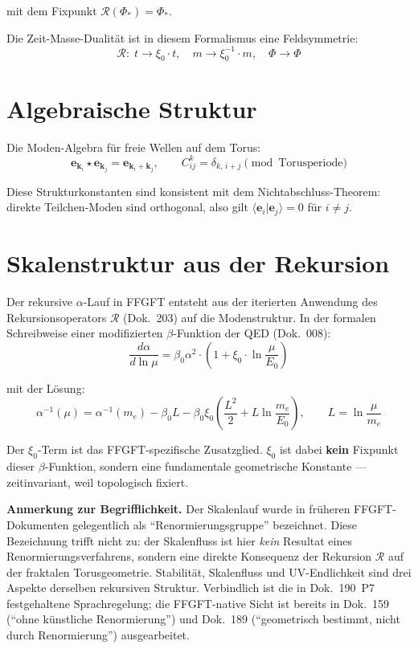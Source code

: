 mit dem Fixpunkt $\mathcal{R}(\Phi_*) = \Phi_*$.

Die Zeit-Masse-Dualität ist in diesem Formalismus eine Feldsymmetrie:
\begin{equation}
  \mathcal{R}:\; t \to \xi_0 \cdot t,\quad m \to \xi_0^{-1} \cdot m,
  \quad \Phi \to \Phi
\end{equation}

\section{Algebraische Struktur}

Die Moden-Algebra für freie Wellen auf dem Torus:
\begin{equation}
  \mathbf{e}_{\mathbf{k}_i} \star \mathbf{e}_{\mathbf{k}_j}
  = \mathbf{e}_{\mathbf{k}_i + \mathbf{k}_j},
  \qquad
  C_{ij}^k = \delta_{k,\,i+j} \pmod{\text{Torusperiode}}
\end{equation}

Diese Strukturkonstanten sind konsistent mit dem Nichtabschluss-Theorem:
direkte Teilchen-Moden sind orthogonal, also gilt
$\langle\mathbf{e}_i|\mathbf{e}_j\rangle = 0$ für $i \neq j$.

\section{Skalenstruktur aus der Rekursion}

Der rekursive $\alpha$-Lauf in FFGFT entsteht aus der iterierten
Anwendung des Rekursionsoperators $\mathcal{R}$ (Dok.~203) auf die
Modenstruktur. In der formalen Schreibweise einer modifizierten
$\beta$-Funktion der QED (Dok.~008):
\begin{equation}
  \frac{d\alpha}{d\ln\mu}
  = \beta_0\alpha^2\cdot\left(1 + \xi_0\cdot\ln\frac{\mu}{E_0}\right)
\end{equation}

mit der Lösung:
\begin{equation}
  \alpha^{-1}(\mu)
  = \alpha^{-1}(m_e)
    - \beta_0 L
    - \beta_0\xi_0\left(\frac{L^2}{2} + L\ln\frac{m_e}{E_0}\right),
  \qquad L = \ln\frac{\mu}{m_e}
\end{equation}

Der $\xi_0$-Term ist das FFGFT-spezifische Zusatzglied.
$\xi_0$ ist dabei \textbf{kein} Fixpunkt dieser $\beta$-Funktion,
sondern eine fundamentale geometrische Konstante --- zeitinvariant,
weil topologisch fixiert.

\medskip

\textbf{Anmerkung zur Begrifflichkeit.}
Der Skalenlauf wurde in früheren FFGFT-Dokumenten gelegentlich als
\enquote{Renormierungsgruppe} bezeichnet. Diese Bezeichnung trifft
nicht zu: der Skalenfluss ist hier \emph{kein} Resultat eines
Renormierungsverfahrens, sondern eine direkte Konsequenz der Rekursion
$\mathcal{R}$ auf der fraktalen Torusgeometrie. Stabilität, Skalenfluss
und UV-Endlichkeit sind drei Aspekte derselben rekursiven Struktur.
Verbindlich ist die in Dok.~190~P7 festgehaltene Sprachregelung; die
FFGFT-native Sicht ist bereits in Dok.~159 (\enquote{ohne künstliche
Renormierung}) und Dok.~189 (\enquote{geometrisch bestimmt, nicht durch
Renormierung}) ausgearbeitet.

